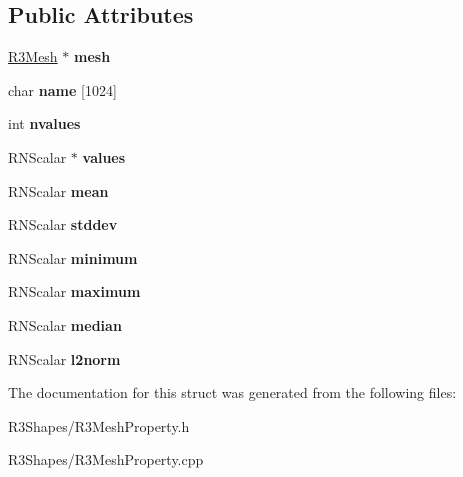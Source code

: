 \subsection*{Public Attributes}
\begin{DoxyCompactItemize}
\item 
\hyperlink{class_r3_mesh}{R3\+Mesh} $\ast$ {\bfseries mesh}\hypertarget{struct_r3_mesh_property_ad79255a593a2af77891041f13c5b9935}{}\label{struct_r3_mesh_property_ad79255a593a2af77891041f13c5b9935}

\item 
char {\bfseries name} \mbox{[}1024\mbox{]}\hypertarget{struct_r3_mesh_property_a91e3d5af959327fbe6f0010ef67628a1}{}\label{struct_r3_mesh_property_a91e3d5af959327fbe6f0010ef67628a1}

\item 
int {\bfseries nvalues}\hypertarget{struct_r3_mesh_property_a40b71617571fa80a32f547382fac2bb0}{}\label{struct_r3_mesh_property_a40b71617571fa80a32f547382fac2bb0}

\item 
R\+N\+Scalar $\ast$ {\bfseries values}\hypertarget{struct_r3_mesh_property_a617e8c968e70517df1e5ba48b1b4d9f2}{}\label{struct_r3_mesh_property_a617e8c968e70517df1e5ba48b1b4d9f2}

\item 
R\+N\+Scalar {\bfseries mean}\hypertarget{struct_r3_mesh_property_a0e8352ba858c779be3dbaa2a7de10b69}{}\label{struct_r3_mesh_property_a0e8352ba858c779be3dbaa2a7de10b69}

\item 
R\+N\+Scalar {\bfseries stddev}\hypertarget{struct_r3_mesh_property_adca5f3df523e21ee5060febbb53693cd}{}\label{struct_r3_mesh_property_adca5f3df523e21ee5060febbb53693cd}

\item 
R\+N\+Scalar {\bfseries minimum}\hypertarget{struct_r3_mesh_property_aa749ffffcda39db1f13742e2e83e1a16}{}\label{struct_r3_mesh_property_aa749ffffcda39db1f13742e2e83e1a16}

\item 
R\+N\+Scalar {\bfseries maximum}\hypertarget{struct_r3_mesh_property_aad47a2d950222667547b785993fe99f4}{}\label{struct_r3_mesh_property_aad47a2d950222667547b785993fe99f4}

\item 
R\+N\+Scalar {\bfseries median}\hypertarget{struct_r3_mesh_property_a89745533907569ced6cc31e0af622066}{}\label{struct_r3_mesh_property_a89745533907569ced6cc31e0af622066}

\item 
R\+N\+Scalar {\bfseries l2norm}\hypertarget{struct_r3_mesh_property_a0121110fee2dad596457bdf1c6996b6e}{}\label{struct_r3_mesh_property_a0121110fee2dad596457bdf1c6996b6e}

\end{DoxyCompactItemize}


The documentation for this struct was generated from the following files\+:\begin{DoxyCompactItemize}
\item 
R3\+Shapes/R3\+Mesh\+Property.\+h\item 
R3\+Shapes/R3\+Mesh\+Property.\+cpp\end{DoxyCompactItemize}

